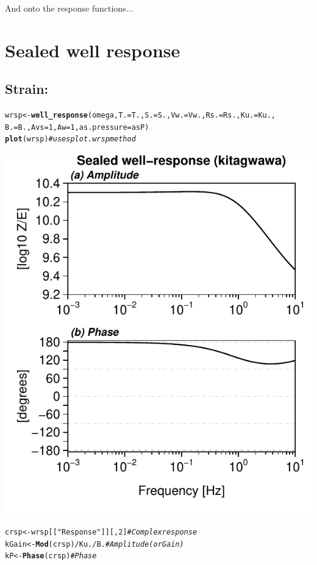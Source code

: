 \documentclass[12pt]{article}\usepackage[]{graphicx}\usepackage[]{color}
\makeatletter
\def\maxwidth{ %
  \ifdim\Gin@nat@width>\linewidth
    \linewidth
  \else
    \Gin@nat@width
  \fi
}
\newcommand{\hlnum}[1]{\textcolor[rgb]{0.686,0.059,0.569}{#1}}%
\newcommand{\hlstr}[1]{\textcolor[rgb]{0.192,0.494,0.8}{#1}}%
\newcommand{\hlcom}[1]{\textcolor[rgb]{0.678,0.584,0.686}{\textit{#1}}}%
\newcommand{\hlopt}[1]{\textcolor[rgb]{0,0,0}{#1}}%
\newcommand{\hlstd}[1]{\textcolor[rgb]{0.345,0.345,0.345}{#1}}%
\newcommand{\hlkwb}[1]{\textcolor[rgb]{0.69,0.353,0.396}{#1}}%
\newcommand{\hlkwc}[1]{\textcolor[rgb]{0.333,0.667,0.333}{#1}}%
\newcommand{\hlkwd}[1]{\textcolor[rgb]{0.737,0.353,0.396}{\textbf{#1}}}%
\newenvironment{kframe}{%
 \def\at@end@of@kframe{}%
 \ifinner\ifhmode%
  \def\at@end@of@kframe{\end{minipage}}%
  \begin{minipage}{\columnwidth}%
 \fi\fi%
 \def\FrameCommand##1{\hskip\@totalleftmargin \hskip-\fboxsep
 \colorbox{shadecolor}{##1}\hskip-\fboxsep
     \hskip-\linewidth \hskip-\@totalleftmargin \hskip\columnwidth}%
 \MakeFramed {\advance\hsize-\width
   \@totalleftmargin\z@ \linewidth\hsize
   \@setminipage}}%
 {\par\unskip\endMakeFramed%
 \at@end@of@kframe}
\newenvironment{knitrout}{}{} %
\makeatother
\begin{document}
And onto the response functions...

\clearpage
\section{Sealed well response}

\subsection{Strain: \citet{kitagawa2011}}
%
\begin{knitrout}\small
{}\color{fgcolor}\begin{kframe}
\begin{alltt}
\hlstd{wrsp} \hlkwb{<-} \hlkwd{well_response}\hlstd{(omega,} \hlkwc{T.} \hlstd{= T.,} \hlkwc{S.} \hlstd{= S.,} \hlkwc{Vw.} \hlstd{= Vw.,} \hlkwc{Rs.} \hlstd{= Rs.,} \hlkwc{Ku.} \hlstd{= Ku.,}
    \hlkwc{B.} \hlstd{= B.,} \hlkwc{Avs} \hlstd{=} \hlnum{1}\hlstd{,} \hlkwc{Aw} \hlstd{=} \hlnum{1}\hlstd{,} \hlkwc{as.pressure} \hlstd{= asP)}
\hlkwd{plot}\hlstd{(wrsp)}  \hlcom{# uses plot.wrsp method}
\end{alltt}
\end{kframe}
\includegraphics[width=\maxwidth]{figure/KITRESP} 
\begin{kframe}\begin{alltt}
\hlstd{crsp} \hlkwb{<-} \hlstd{wrsp[[}\hlstr{"Response"}\hlstd{]][,} \hlnum{2}\hlstd{]}  \hlcom{# Complex response}
\hlstd{kGain} \hlkwb{<-} \hlkwd{Mod}\hlstd{(crsp)}\hlopt{/}\hlstd{Ku.}\hlopt{/}\hlstd{B.}  \hlcom{# Amplitude (or Gain)}
\hlstd{kP} \hlkwb{<-} \hlkwd{Phase}\hlstd{(crsp)}  \hlcom{# Phase}
\end{alltt}
\end{kframe}
\end{knitrout}
\end{document}
